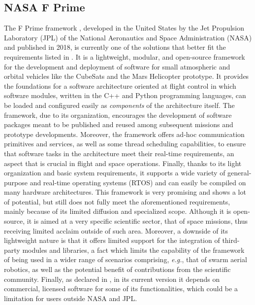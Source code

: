 \subsection{NASA F Prime}
\label{sec:related_work_fprime}
The F Prime framework \cite{bocchino_f_2018}, developed in the United States by the Jet Propulsion Laboratory (JPL) of the National Aeronautics and Space Administration (NASA) and published in 2018, is currently one of the solutions that better fit the requirements listed in . It is a lightweight, modular, and open-source framework for the development and deployment of software for small atmospheric and orbital vehicles like the CubeSats and the Mars Helicopter prototype. It provides the foundations for a software architecture oriented at flight control in which software modules, written in the C++ and Python programming languages, can be loaded and configured easily as \emph{components} of the architecture itself. The framework, due to its organization, encourages the development of software packages meant to be published and reused among subsequent missions and prototype developments. Moreover, the framework offers ad-hoc communication primitives and services, as well as some thread scheduling capabilities, to ensure that software tasks in the architecture meet their real-time requirements, an aspect that is crucial in flight and space operations. Finally, thanks to its light organization and basic system requirements, it supports a wide variety of general-purpose and real-time operating systems (RTOS) and can easily be compiled on many hardware architectures. This framework is very promising and shows a lot of potential, but still does not fully meet the aforementioned requirements, mainly because of its limited diffusion and specialized scope. Although it is open-source, it is aimed at a very specific scientific sector, that of space missions, thus receiving limited acclaim outside of such area. Moreover, a downside of its lightweight nature is that it offers limited support for the integration of third-party modules and libraries, a fact which limits the capability of the framework of being used in a wider range of scenarios comprising, \emph{e.g.}, that of swarm aerial robotics, as well as the potential benefit of contributions from the scientific community. Finally, as declared in \cite{bocchino_f_2018}, in its current version it depends on commercial, licensed software for some of its functionalities, which could be a limitation for users outside NASA and JPL.

